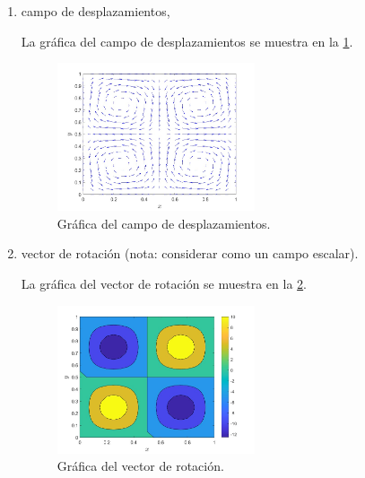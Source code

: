 \documentclass[./../main.tex]{subfiles}
\begin{document}
    \begin{enumerate}[resume, label=\arabic*)]
        \item campo de desplazamientos,
        
        La gráfica del campo de desplazamientos se muestra en la \cref{fig:displacement_field}.

        \begin{figure}[htb]
            \centering
            \includegraphics[width=0.55\textwidth]{campo-desplazamientos.jpg}
            \caption{Gráfica del campo de desplazamientos.}
            \label{fig:displacement_field}
        \end{figure}
        
        \item vector de rotación (nota: considerar como un campo escalar).
        
        La gráfica del vector de rotación se muestra en la \cref{fig:rotation_vector}.

        \begin{figure}[htb]
            \centering
            \includegraphics[width=0.55\textwidth]{vector-rotacion.jpg}
            \caption{Gráfica del vector de rotación.}
            \label{fig:rotation_vector}
        \end{figure}
    \end{enumerate}
\end{document}
